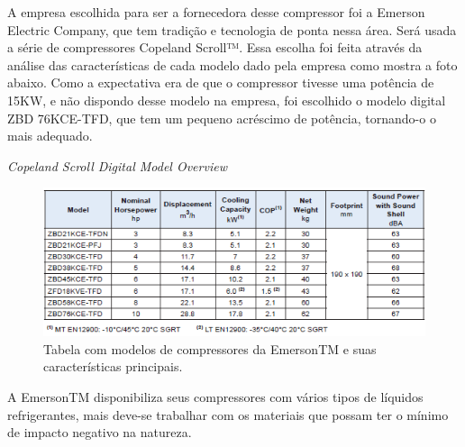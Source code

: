 A empresa escolhida para ser a fornecedora desse compressor foi a Emerson Electric Company, que tem tradição e tecnologia de ponta nessa área. Será usada a série de compressores Copeland Scroll™.  Essa escolha foi feita através da análise das características de cada modelo dado pela empresa como mostra a foto abaixo. Como a expectativa era de que o compressor tivesse uma potência de 15KW, e não dispondo desse modelo na empresa, foi escolhido o modelo digital ZBD 76KCE-TFD, que tem um pequeno acréscimo de potência, tornando-o o mais adequado. 

\textit{Copeland Scroll Digital Model Overview}

	\begin{figure}[!htbp]
	  \centering
	  \includegraphics[scale=0.5]{editaveis/figuras/tabela_compressores}
	  \caption[Modelos de compressores]{Tabela com modelos de compressores da EmersonTM e suas características principais.\footnotemark}
	  \label{tabela_compressores}
	\end{figure}
	\FloatBarrier
A EmersonTM disponibiliza seus compressores com vários tipos de líquidos refrigerantes, mais deve-se trabalhar com os materiais que possam ter o mínimo de impacto negativo na natureza. 


